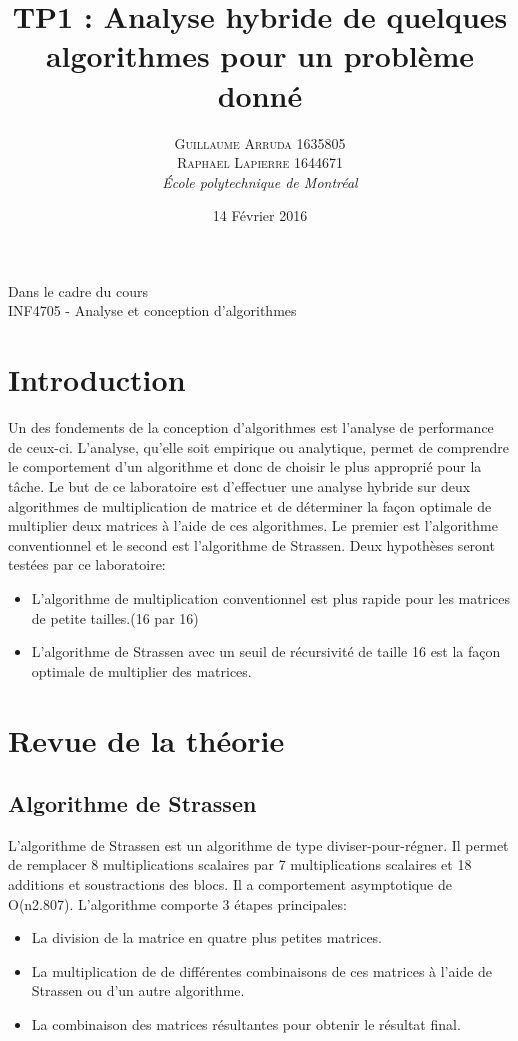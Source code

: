 \documentclass[a4paper, 12pt]{article} %
\title{TP1 : Analyse hybride de quelques algorithmes pour un problème donné}
\author{\textsc{Guillaume Arruda 1635805\\Raphael Lapierre 1644671} %
\vspace{10pt}
\\{\textit{École polytechnique de Montréal}}} %
\date{14 Février 2016} %
\makeatletter
\renewcommand{\maketitle}{ %
\begin{center} %

\vspace*{25pt} %
{\LARGE\@title} %

\vspace{125pt} %

{\large\@author} %

\vspace{125pt} %
Dans le cadre du cours
\\INF4705 - Analyse et conception d'algorithmes
\vspace{125pt} %
\\\@date %
\vspace{125pt} %

\end{center}
}
\makeatother
\begin{document}
\thispagestyle{empty}
\clearpage\maketitle %
\pagebreak[4]
\tableofcontents
\pagebreak[4]

\setlength{\headheight}{15.0pt}
\pagestyle{fancy}
\fancyhead[C]{}

\section{Introduction}
Un des fondements de la conception d'algorithmes est l'analyse de performance de ceux-ci. L'analyse, qu'elle soit empirique ou analytique, permet de comprendre le comportement d'un algorithme
et donc de choisir le plus approprié pour la tâche. Le but de ce laboratoire est d'effectuer une analyse hybride sur deux algorithmes de multiplication de matrice et de déterminer la façon optimale de multiplier deux matrices à l'aide de ces algorithmes. Le premier est l'algorithme conventionnel et le second est l'algorithme de Strassen. Deux hypothèses seront testées par ce laboratoire:
\begin{itemize}
\item L'algorithme de multiplication conventionnel est plus rapide pour les matrices de petite tailles.(16 par 16)
\item L'algorithme de Strassen avec un seuil de récursivité de taille 16 est la façon optimale de multiplier des matrices.
\end{itemize}
\section{Revue de la théorie}
\subsection{Algorithme de Strassen}
L'algorithme de Strassen est un algorithme de type diviser-pour-régner. Il permet de remplacer 8 multiplications scalaires par 7 multiplications scalaires et 18 additions et soustractions des blocs. 
Il a comportement asymptotique de O(n2.807). L'algorithme comporte 3 étapes principales:
\begin{itemize}
\item La division de la matrice en quatre plus petites matrices.
\item La multiplication de de différentes combinaisons de ces matrices à l'aide de Strassen ou d'un autre algorithme.
\item La combinaison des matrices résultantes pour obtenir le résultat final.
\end{itemize}
\end{document}
